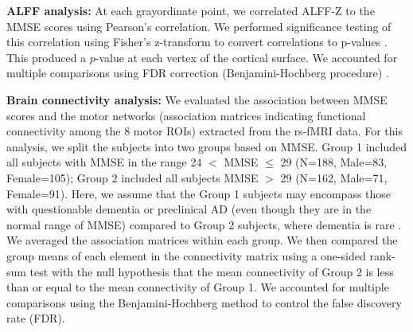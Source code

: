 \documentclass[review,3p,times,12pt,letterpaper]{elsarticle}
\newcommand{\dws}[1]{{\color{red} [#1]}}
\begin{document}
\noindent\textbf{ALFF analysis:} 
At each grayordinate point, we correlated ALFF-Z to the MMSE scores using Pearson's correlation. We performed significance testing of this correlation using Fisher's z-transform to convert correlations to p-values \cite{fisher1915frequency}. This produced a $p$-value at each vertex of the cortical surface. We accounted for multiple comparisons using FDR correction (Benjamini-Hochberg procedure) \cite{Benjamini_1995_Controlling_false_discovery}. 

\noindent\textbf{Brain connectivity analysis:}
\label{sec:brain_conn_analysis}
We evaluated the association between MMSE scores and the motor networks (association matrices indicating functional connectivity among the 8 motor ROIs) extracted from the rs-fMRI data. For this analysis, we split the subjects into two groups based on MMSE. Group 1 included all subjects with MMSE in the range 24 $<$ MMSE $\leq$ 29  (N=188, Male=83, Female=105); Group 2 included all subjects MMSE $>$ 29 (N=162, Male=71, Female=91). Here, we assume that the Group 1 subjects may encompass those with questionable dementia or preclinical AD \cite{vos2013preclinical,perneczky2006mapping} (even though they are in the normal range of MMSE) compared to Group 2 subjects, where dementia is rare \cite{shiroky2007can}.  
We averaged the association matrices within each group. We then compared the group means of each element in the connectivity matrix using a one-sided rank-sum test with the null hypothesis that the mean connectivity of Group 2 is less than or equal to the mean connectivity of Group 1. We accounted for multiple comparisons using the Benjamini-Hochberg method \cite{Benjamini_1995_Controlling_false_discovery} to control the false discovery rate (FDR).

\end{document}
